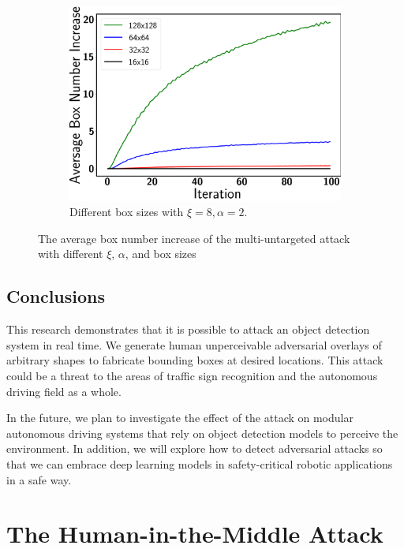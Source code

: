 \begin{figure}[H]
\begin{subfigure}[b]{0.65\textwidth}
    \centering
    \includegraphics[width=\textwidth]{figures/chapter_detection/detection/multi_untargeted_box_box.png}
    \caption{Different box sizes with $\xi=8, \alpha=2$.}
    \label{fig:box_box}
\end{subfigure}
\caption{The average box number increase of the multi-untargeted attack with different $\xi$, $\alpha$, and box sizes}
\label{fig.hyper_box}
\end{figure}

\clearpage

\subsection{Conclusions}

This research demonstrates that it is possible to attack an object detection system in real time. We generate human unperceivable adversarial overlays of arbitrary shapes to fabricate bounding boxes at desired locations. This attack could be a threat to the areas of traffic sign recognition and the autonomous driving field as a whole.

In the future, we plan to investigate the effect of the attack on modular autonomous driving systems that rely on object detection models to perceive the environment. In addition, we will explore how to detect adversarial attacks so that we can embrace deep learning models in safety-critical robotic applications in a safe way.


\section{The Human-in-the-Middle Attack}

